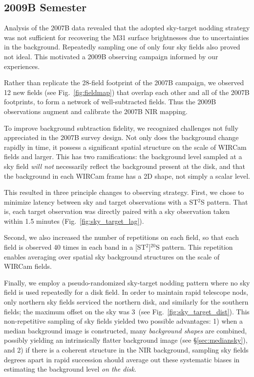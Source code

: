 \documentclass[iop]{emulateapj}
\newcommand{\Fig}[1]{Fig.~\ref{fig:#1}}  %
\newcommand{\Sec}[1]{\S\ref{sec:#1}}  %
\begin{document}
\subsection{2009B Semester}
\label{sub:obs9}

Analysis of the 2007B data revealed that the adopted sky-target nodding strategy was not sufficient for recovering the M31 surface brightnesses due to uncertainties in the background.
Repeatedly sampling one of only four sky fields also proved not ideal.
This motivated a 2009B observing campaign informed by our experiences.

Rather than replicate the 28-field footprint of the 2007B campaign, we observed 12 new fields (see \Fig{fieldmap}) that overlap each other and all of the 2007B footprints, to form a network of well-subtracted fields.
Thus the 2009B observations augment and calibrate the 2007B NIR mapping.

To improve background subtraction fidelity, we recognized challenges not fully appreciated in the 2007B survey design.
Not only does the background change rapidly in time, it possess a significant spatial structure on the scale of WIRCam fields and larger.
This has two ramifications: the background level sampled at a sky field \emph{will not} necessarily reflect the background present at the disk, and that the background in each WIRCam frame has a 2D shape, not simply a scalar level.

This resulted in three principle changes to observing strategy. First, we chose to minimize latency between sky and target observations with a ST$^2$S pattern. That is, each target observation was directly paired with a sky observation taken within 1.5 minutes (\Fig{sky_target_lag}).

Second, we also increased the number of repetitions on each field, so that each field is observed 40 times in each band in a [ST$^2$]$^{20}$S pattern. This repetition enables averaging over spatial sky background structures on the scale of WIRCam fields.

Finally, we employ a pseudo-randomized sky-target nodding pattern where no sky field is used repeatedly for a disk field.
In order to maintain rapid telescope nods, only northern sky fields serviced the northern disk, and similarly for the southern fields; the maximum offset on the sky was 3\arcdeg\ (see \Fig{sky_target_dist}).
This non-repetitive sampling of sky fields yielded two possible advantages: 1) when a median background image is constructed, many \emph{background shapes} are combined, possibly yielding an intrinsically flatter background image (see \Sec{mediansky}), and 2) if there is a coherent structure in the NIR background, sampling sky fields degrees apart in rapid succession should average out these systematic biases in estimating the background level \emph{on the disk}.
\end{document}
